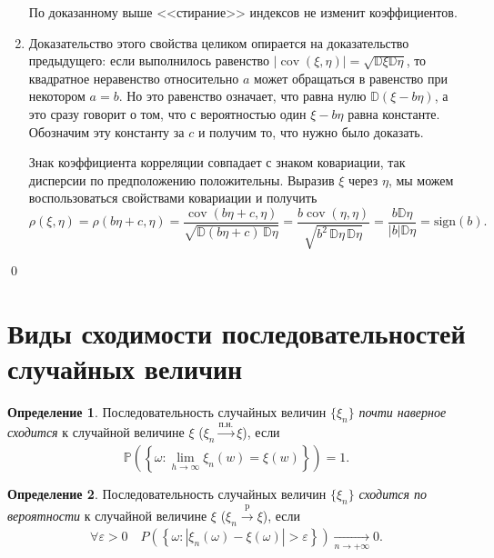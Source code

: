 \documentclass[oneside,final,14pt]{extreport}
\renewenvironment{proof}{{\bfseries Доказательство.}}{\qed}
\theoremstyle{plain}
\theoremstyle{definition}
\newtheorem*{defn}{Определение}
\theoremstyle{named}
\begin{document}
\begin{proof}
\begin{enumerate}
    По доказанному выше <<стирание>> индексов не изменит коэффициентов.

    \item Доказательство этого свойства целиком опирается на доказательство предыдущего: если выполнилось равенство $|\operatorname{cov}(\xi, \eta)|=\sqrt{\mathbb{D} \xi \mathbb{D} \eta}$, то квадратное неравенство относительно $a$ может обращаться в равенство при некотором $a = b$. Но это равенство означает, что равна нулю $\mathbb{D}(\xi-b \eta)$, а это сразу говорит о том, что с вероятностью один $\xi - b\eta$ равна константе. Обозначим эту константу за $c$ и получим то, что нужно было доказать.
    
    Знак коэффициента корреляции совпадает с знаком ковариации, так дисперсии по предположению положительны. Выразив $\xi$ через $\eta$, мы можем воспользоваться свойствами ковариации и получить
    $$ \rho(\xi, \eta) = \rho(b\eta + c, \eta)=
    \frac{\operatorname{cov}(b\eta + c, \eta)}
    {\sqrt{\mathbb{D}(b\eta + c) \, \mathbb{D}\eta}} = 
    \frac{b\operatorname{cov}(\eta, \eta)}
    {\sqrt{b^2\, \mathbb{D}\eta \, \mathbb{D}\eta}} = 
    \frac{b\mathbb{D}\eta}
    {|b|\mathbb{D}\eta} = 
    \text{sign}(b).
    $$

\end{enumerate}
\end{proof}

\section{Виды сходимости последовательностей случайных величин}
\begin{defn}
    Последовательность случайных величин $\{\xi_n\}$ {\it почти наверное сходится} к случайной величине $\xi$ ($\xi_n \xrightarrow[]{\text{п.н.}} \xi$), если
    \begin{equation*}
        \mathbb{P}\left(\left\{\omega \colon \lim\limits _{h \rightarrow \infty} \xi_{n}(w)=\xi(w)\right\}\right)=1.
    \end{equation*}
\end{defn}

\begin{defn}
    Последовательность случайных величин $\{\xi_n\}$ {\it сходится по вероятности} к случайной величине $\xi$ ($\xi_n \xrightarrow[]{\text{p}} \xi$), если
    \begin{equation*}
        \forall \varepsilon>0 \quad P\left(\left\{\omega \colon |\xi_{n}(\omega)-\xi(\omega)|>\varepsilon\right\}\right) \xrightarrow[n \to +\infty]{} 0.
    \end{equation*}
\end{defn}
\end{document}
